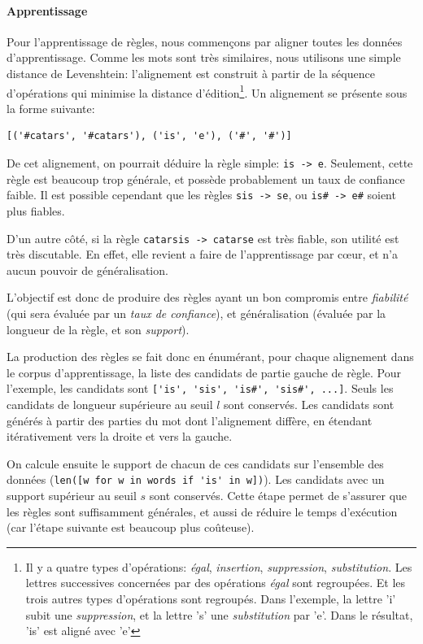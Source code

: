 \documentclass{article}
\begin{document}
\paragraph{Apprentissage}
Pour l'apprentissage de règles, nous commençons par aligner toutes les données d'apprentissage. Comme les mots sont très similaires, nous utilisons une simple distance de Levenshtein: l'alignement est construit à partir de la séquence d'opérations qui minimise la distance d'édition\footnote{Il y a quatre types d'opérations: \emph{égal}, \emph{insertion}, \emph{suppression}, \emph{substitution}. Les lettres successives concernées par des opérations \emph{égal} sont regroupées. Et les trois autres types d'opérations sont regroupés. Dans l'exemple, la lettre 'i' subit une \emph{suppression}, et la lettre 's' une \emph{substitution} par 'e'. Dans le résultat, 'is' est aligné avec 'e'}.
Un alignement se présente sous la forme suivante:
\begin{verbatim}
[('#catars', '#catars'), ('is', 'e'), ('#', '#')]
\end{verbatim}

De cet alignement, on pourrait déduire la règle simple: \verb|is -> e|. Seulement, cette règle est beaucoup trop générale, et possède probablement un taux de confiance faible. Il est possible cependant que les règles \verb|sis -> se|, ou \verb|is# -> e#| soient plus fiables.

D'un autre côté, si la règle \verb|catarsis -> catarse| est très fiable, son utilité est très discutable. En effet, elle revient a faire de l'apprentissage par c\oe{}ur, et n'a aucun pouvoir de généralisation.

L'objectif est donc de produire des règles ayant un bon compromis entre \emph{fiabilité} (qui sera évaluée par un \emph{taux de confiance}), et généralisation (évaluée par la longueur de la règle, et son \emph{support}).

La production des règles se fait donc en énumérant, pour chaque alignement dans le corpus d'apprentissage, la liste des candidats de partie gauche de règle. Pour l'exemple, les candidats sont \verb|['is', 'sis', 'is#', 'sis#', ...]|. Seuls les candidats de longueur supérieure au seuil $l$ sont conservés. Les candidats sont générés à partir des parties du mot dont l'alignement diffère, en étendant itérativement vers la droite et vers la gauche.

On calcule ensuite le support de chacun de ces candidats sur l'ensemble des données (\verb|len([w for w in words if 'is' in w])|).
Les candidats avec un support supérieur au seuil $s$ sont conservés. Cette étape permet de s'assurer que les règles sont suffisamment générales, et aussi de réduire le temps d'exécution (car l'étape suivante est beaucoup plus coûteuse).
\end{document}
